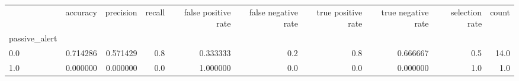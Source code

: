 \begin{tabular}{lrrrrrrrrr}
\toprule
{} &  accuracy &  precision &  recall &  false positive rate &  false negative rate &  true positive rate &  true negative rate &  selection rate &  count \\
passive\_alert &           &            &         &                      &                      &                     &                     &                 &        \\
\midrule
0.0           &  0.714286 &   0.571429 &     0.8 &             0.333333 &                  0.2 &                 0.8 &            0.666667 &             0.5 &   14.0 \\
1.0           &  0.000000 &   0.000000 &     0.0 &             1.000000 &                  0.0 &                 0.0 &            0.000000 &             1.0 &    1.0 \\
\bottomrule
\end{tabular}
